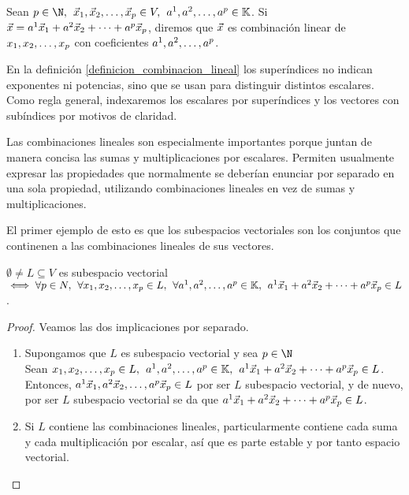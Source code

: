 \documentclass[../ecuaciones_diferenciales.tex]{subfiles}
\begin{document}
\begin{definition}
    \label{definicion_combinacion_lineal}
    Sean $p \in \N, \spc \dlst{\vx}{p} \in V, \spc \ulst{a}{p} \in \K$. Si $\vec{x} = {a}^{1}\vec{x}_{1}+{a}^{2}\vec{x}_{2}+\dots+{a}^{p}\vec{x}_{p}$, diremos que $\vec{x}$ es combinación linear de ${x}_{1}, {x}_{2}, \dots, {x}_{p}$ con coeficientes ${a}^{1}, {a}^{2}, \dots, {a}^{p}$.

\end{definition}

\begin{remark}
    En la definición \ref{definicion_combinacion_lineal} los superíndices no indican exponentes ni potencias, sino que se usan para distinguir distintos escalares. Como regla general, indexaremos los escalares por superíndices y los vectores con subíndices por motivos de claridad.
\end{remark}

Las combinaciones lineales son especialmente importantes porque juntan de manera concisa las sumas y multiplicaciones por escalares. Permiten usualmente expresar las propiedades que normalmente se deberían enunciar por separado en una sola propiedad, utilizando combinaciones lineales en vez de sumas y multiplicaciones. 

El primer ejemplo de esto es que los subespacios vectoriales son los conjuntos que continenen a las combinaciones lineales de sus vectores.


\begin{proposition}
    $\emptyset \ne L \subseteq V$ es subespacio vectorial $\iff \forall p \in N, \hspace{1.5mm} \forall {x}_{1}, {x}_{2}, \dots, {x}_{p} \in L, \hspace{1.5mm} \forall {a}^{1}, {a}^{2}, \dots, {a}^{p} \in \mathbb{K}, \hspace{1.5mm} {a}^{1}\vec{x}_{1}+{a}^{2}\vec{x}_{2}+\dots+{a}^{p}\vec{x}_{p} \in L$.
\end{proposition}

\begin{proof}
    Veamos las dos implicaciones por separado.
    \begin{enumerate}
        \item[\protect\fbox{$\Rightarrow$}] Supongamos que $L$ es subespacio vectorial y sea $p \in \N$ \\
        Sean ${x}_{1}, {x}_{2}, \dots, {x}_{p} \in L, \hspace{1.5mm} {a}^{1}, {a}^{2}, \dots, {a}^{p} \in \mathbb{K}, \hspace{1.5mm} {a}^{1}\vec{x}_{1}+{a}^{2}\vec{x}_{2}+\dots+{a}^{p}\vec{x}_{p} \in L$. Entonces, $a^1 \vec{x}_1, a^2\vec{x}_2, \dots, a^p\vec{x}_p \in L$ por ser $L$ subespacio vectorial, y de nuevo, por ser $L$ subespacio vectorial se da que ${a}^{1}\vec{x}_{1}+{a}^{2}\vec{x}_{2}+\dots+{a}^{p}\vec{x}_{p} \in L$. 
        \item[\protect\fbox{$\Leftarrow$}] Si $L$ contiene las combinaciones lineales, particularmente contiene cada suma y cada multiplicación por escalar, así que es parte estable y por tanto espacio vectorial.
    \end{enumerate} 
\end{proof}
\end{document}
